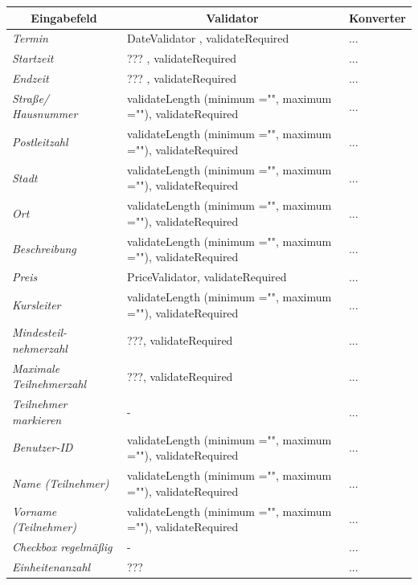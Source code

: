 \begin{itemize}
				\begin{center}
					\begin{longtable}{|p{3cm} |p{8cm} | p{5cm}|}
						
						\hline \multicolumn{1}{|c|}{\textbf{Eingabefeld}} & \multicolumn{1}{|c|}{\textbf{Validator}} & \multicolumn{1}{|c|}{\textbf{Konverter}} \\ \hline
						\endfirsthead
						\hline
						\endlastfoot
						\textit{Termin} & DateValidator , validateRequired & ... \\ \hline
						\textit{Startzeit} & ??? , validateRequired & ... \\ \hline
						\textit{Endzeit} & ??? , validateRequired & ... \\ \hline
						\textit{Straße/ Hausnummer} & validateLength (minimum ="", maximum =""), validateRequired & ... \\ \hline
						\textit{Postleitzahl} & validateLength (minimum ="", maximum =""), validateRequired & ... \\ \hline
						\textit{Stadt} & validateLength (minimum ="", maximum =""), validateRequired & ...  \\ \hline
						\textit{Ort} & validateLength (minimum ="", maximum =""), validateRequired & ...  \\ \hline
						\textit{Beschreibung} & validateLength (minimum ="", maximum =""), validateRequired & ... \\ \hline
						\textit{Preis} & PriceValidator, validateRequired  & ... \\ \hline
						\textit{Kursleiter} & validateLength (minimum ="", maximum =""), validateRequired & ...  \\ \hline
						\textit{Mindesteil- nehmerzahl} & ???, validateRequired & ... \\ \hline
						\textit{Maximale Teilnehmerzahl} & ???, validateRequired & ... \\ \hline
						\textit{Teilnehmer markieren} & - & ... \\ \hline
						\textit{Benutzer-ID} & validateLength (minimum ="", maximum =""), validateRequired & ... \\ \hline
						\textit{Name (Teilnehmer)} & validateLength (minimum ="", maximum =""), validateRequired & ... \\ \hline
						\textit{Vorname (Teilnehmer)} & validateLength (minimum ="", maximum =""), validateRequired & ... \\ \hline
						\textit{Checkbox regelmäßig} & - & ... \\ \hline
						\textit{Einheitenanzahl} & ??? & ... \\ \hline
					\end{longtable}
				\end{center}
				

\end{itemize}
